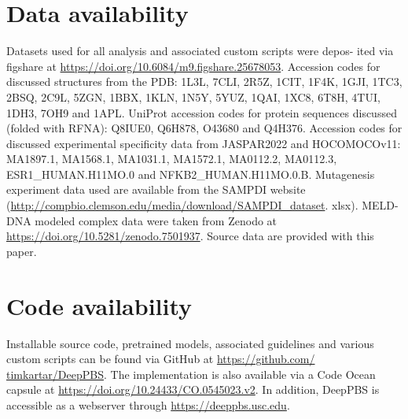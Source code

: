 \section{Data availability}
Datasets used for all analysis and associated custom scripts were depos-
ited via figshare at \url{https://doi.org/10.6084/m9.figshare.25678053}. Accession codes for discussed structures from the PDB: 1L3L,
7CLI, 2R5Z, 1CIT, 1F4K, 1GJI, 1TC3, 2BSQ, 2C9L, 5ZGN, 1BBX, 1KLN,
1N5Y, 5YUZ, 1QAI, 1XC8, 6T8H, 4TUI, 1DH3, 7OH9 and 1APL. UniProt
accession codes for protein sequences discussed (folded with RFNA):
Q8IUE0, Q6H878, O43680 and Q4H376. Accession codes for discussed
experimental specificity data from JASPAR2022 and HOCOMOCOv11:
MA1897.1, MA1568.1, MA1031.1, MA1572.1, MA0112.2, MA0112.3,
ESR1\_HUMAN.H11MO.0 and NFKB2\_HUMAN.H11MO.0.B. Mutagenesis experiment data used are available from the SAMPDI website
(\url{http://compbio.clemson.edu/media/download/SAMPDI\_dataset}.
xlsx). MELD-DNA modeled complex data were taken from Zenodo
at \url{https://doi.org/10.5281/zenodo.7501937}. Source data are
provided with this paper.

\section{Code availability}
Installable source code, pretrained models, associated guidelines and
various custom scripts can be found via GitHub at \url{https://github.com/
timkartar/DeepPBS}. The implementation is also available via a Code
Ocean capsule at \url{https://doi.org/10.24433/CO.0545023.v2}. In addition,
DeepPBS is accessible as a webserver through \url{https://deeppbs.usc.edu}.
